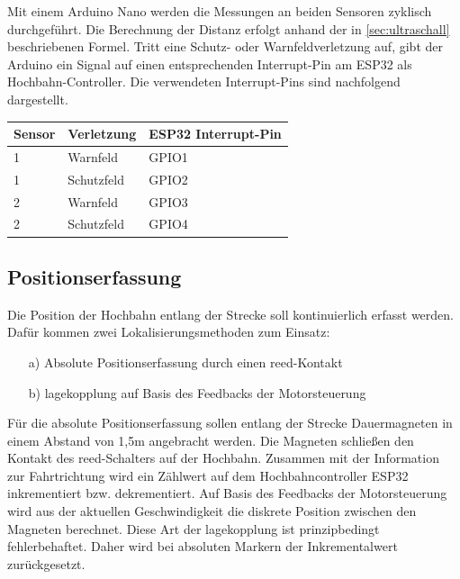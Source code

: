 Mit einem Arduino Nano werden die Messungen an beiden Sensoren zyklisch durchgeführt. Die Berechnung der Distanz erfolgt anhand der in \autoref{sec:ultraschall} beschriebenen Formel. Tritt eine Schutz- oder Warnfeldverletzung auf, gibt der Arduino ein Signal auf einen entsprechenden Interrupt-Pin am ESP32 als  Hochbahn-Controller. Die verwendeten Interrupt-Pins sind nachfolgend dargestellt. \\


\begin{center}
	\begin{tabular}[h]{l|l|l}
		Sensor & Verletzung  & ESP32 Interrupt-Pin \\
		\hline
		1 & Warnfeld & GPIO1\\
		\hline
		1 & Schutzfeld & GPIO2\\
		\hline
		2 & Warnfeld & GPIO3\\
		\hline
		2 & Schutzfeld & GPIO4\\	
	\end{tabular}
\end{center}
\newpage

\subsection{Positionserfassung}
\label{konzeptPositionserfassung}
Die Position der Hochbahn entlang der Strecke soll kontinuierlich erfasst werden. Dafür kommen zwei Lokalisierungsmethoden zum Einsatz: 

 \begin{itemize}
 	\item [a)] Absolute Positionserfassung durch einen \acrshort{reed}-Kontakt
 	\item[b)] \acrshort{lagekopplung} auf Basis des Feedbacks der Motorsteuerung  
 \end{itemize}

Für die absolute Positionserfassung sollen entlang der Strecke Dauermagneten in einem Abstand von 1,5m angebracht werden. Die Magneten schließen den Kontakt des  \acrshort{reed}-Schalters auf der Hochbahn. Zusammen mit der Information zur Fahrtrichtung wird ein Zählwert auf dem Hochbahncontroller ESP32 inkrementiert bzw. dekrementiert. Auf Basis des Feedbacks der Motorsteuerung wird aus der aktuellen Geschwindigkeit die diskrete Position zwischen den Magneten berechnet. Diese Art der \acrshort{lagekopplung} ist prinzipbedingt fehlerbehaftet. Daher wird bei absoluten Markern der Inkrementalwert zurückgesetzt. 
\newpage

